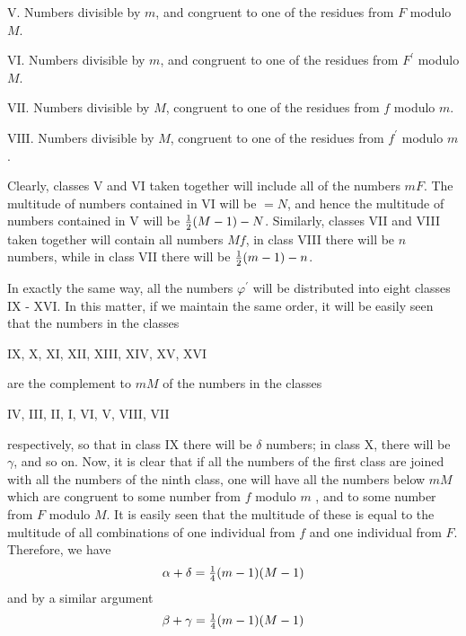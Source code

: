 \documentclass[twoside,12pt]{memoir}
\let\oldfrac\frac
\def\frac#1#2{\mathchoice{\tfrac{#1}{#2}}{\oldfrac{#1}{#2}}{\genfrac{}{}{}{2}{#1}{#2\mathstrut}}{\genfrac{}{}{}{3}{#1}{#2\mathstrut}}}
\begin{document}
\(\text{V.}\) Numbers divisible by \(m\), and congruent to one of the residues from \(F\) modulo \(M\).

\(\text{VI.}\) Numbers divisible by \(m\), and congruent to one of the residues from \(F^{\prime}\) modulo \(M\).

\(\text{VII.}\) Numbers divisible by \(M\), congruent to one of the residues from \(f\) modulo \(m\).

\(\text{VIII.}\) Numbers divisible by \(M\), congruent to one of the residues from \(f^{\prime}\) modulo \(m\).

Clearly, classes V and VI taken together will include all of the numbers \(mF\).  The multitude of numbers contained in VI will be \(=N\), and hence the multitude of numbers contained in V will be \(\frac{1}{2}(M-1)-N\). Similarly, classes VII and VIII taken together will contain all numbers \(Mf\), in class VIII there will be \(n\) numbers, while in class VII there will be \(\frac{1}{2}(m-1)-n\).
%

In exactly the same way, all the numbers \(\varphi^{\prime}\) will be distributed into eight classes IX - XVI. In this matter, if we maintain the same order, it will be easily seen that the numbers in the classes
\begin{center} IX, X, XI, XII, XIII, XIV, XV, XVI \end{center}
are the complement to \(mM\) of the numbers in the classes
\begin{center} IV, III, II, I, VI, V, VIII, VII \end{center}
respectively, so that in class IX there will be \(\delta\) numbers; in class X, there will be \(\gamma\), and so on. Now, it is clear that if all the numbers of the first class are joined with all the numbers of the ninth class, one will have all the numbers below \(m M\) which are congruent to some number from \(f\) modulo \(m\) , and to some number from \(F\) modulo \(M\).  It is easily seen that the multitude of these is equal to the multitude of all combinations of one individual from \(f\) and one individual from \(F\). Therefore, we have
\[\alpha+\delta=\frac{1}{4}(m-1)(M-1)\]
and by a similar argument
\[\beta+\gamma=\frac{1}{4}(m-1)(M-1)\]
%
\end{document}
